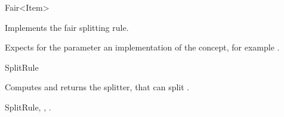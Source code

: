

\begin{ccRefFunctionObjectClass}{Fair<Item>}  %


\ccDefinition
Implements the fair splitting rule.

\ccParameters

Expects for the parameter  an implementation of the
 concept, for example .


\ccIsModel

SplitRule

\ccTypes


\ccCreation
{}  %



{Computes and returns the splitter, that can split .}

\ccSeeAlso

SplitRule,
,
.

\end{ccRefFunctionObjectClass}


